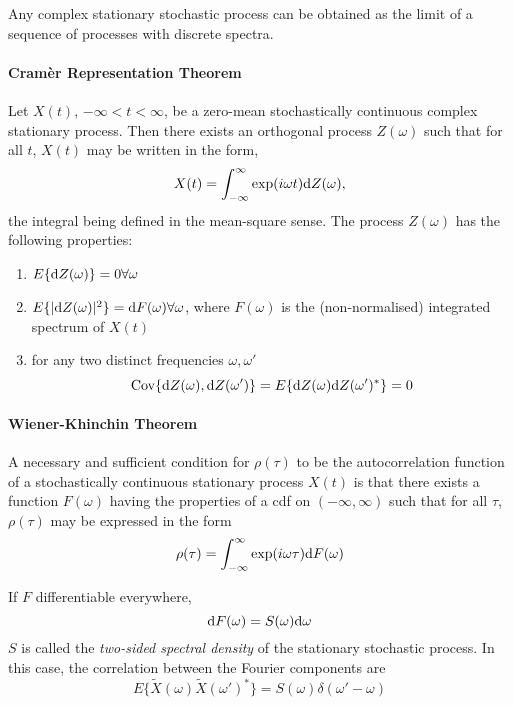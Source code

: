 Any complex stationary stochastic process can be obtained as the limit of a sequence of processes with discrete spectra. 

\paragraph{Cram\`er Representation Theorem} Let $X(t)$, $-\infty < t < \infty$, be a zero-mean stochastically continuous complex stationary process. Then there exists an orthogonal process $Z(\omega)$ such that for all $t$, $X(t)$ may be written in the form,
\begin{equation}
X(t)=\int^{\infty}_{-\infty}\exp(i\omega t) {\mbox{d}} Z(\omega),
\end{equation}
the integral being defined in the mean-square sense. The process $Z(\omega)$ has the following properties:
\begin{enumerate}
\item $E\{{\mbox{d}} Z(\omega) \} = 0 \forall \omega$
\item $E\{|{\mbox{d}} Z(\omega)|^2 \} = {\mbox{d}} F(\omega) \forall \omega$, where $F(\omega)$ is the (non-normalised) integrated spectrum of $X(t)$
\item for any two distinct frequencies $\omega, \omega'$
\begin{equation}
\mbox{Cov}\{{\mbox{d}} Z(\omega), {\mbox{d}} Z(\omega') \} = E\{ {\mbox{d}} Z(\omega) {\mbox{d}} Z(\omega')^* \} =0
\end{equation} 
\end{enumerate}

\paragraph{Wiener-Khinchin Theorem} A necessary and sufficient condition for $\rho(\tau)$ to be the autocorrelation function of a stochastically continuous stationary process $X(t)$ is that there exists a function $F(\omega)$ having the properties of a cdf on $(-\infty, \infty)$ such that for all $\tau$, $\rho(\tau)$ may be expressed in the form
\begin{equation}
\rho(\tau)=\int^{\infty}_{-\infty}\exp(i\omega \tau) {\mbox{d}} F(\omega)
\end{equation}

If $F$ differentiable everywhere, 
\begin{equation}
{\mbox{d}} F(\omega)=S(\omega) {\mbox{d}} \omega
\end{equation}
$S$ is called the \textit{two-sided spectral density} of the stationary stochastic process. In this case, the correlation between the Fourier components are 
\begin{equation}
E\{\tilde{X}(\omega) \tilde{X}(\omega ' )^* \} = S(\omega) \delta(\omega ' -\omega)
\end{equation}

